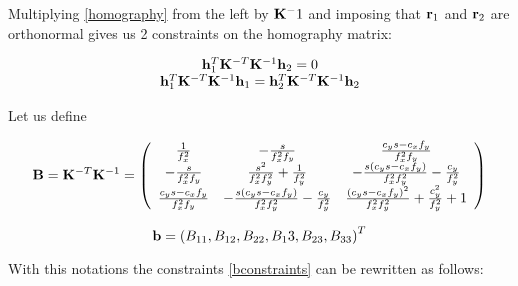 \documentclass[a4paper,10pt]{article}
\begin{document}
Multiplying \eqref{homography} from the left by ${\bf K}^-1$ and imposing that ${\bf r}_1$ and ${\bf r}_2$ are orthonormal gives us 2 constraints on the homography matrix:

{
\begin{equation}
\begin{array}{c}
 {\bf h}_1^T {\bf K}^{-T} {\bf K}^{-1}{\bf h}_2 = 0 \\
 {\bf h}_1^T {\bf K}^{-T} {\bf K}^{-1}{\bf h}_1 = {\bf h}_2^T {\bf K}^{-T} {\bf K}^{-1}{\bf h}_2
\end{array} \label{bconstraints}
\end{equation}
}

Let us define 

{
\begin{equation}
 {\bf B} = {\bf K}^{-T} {\bf K}^{-1} = \left(
 \begin{array}{ccc}
 \frac{1}{f_x^2} & -\frac{s}{f_x^2 f_y} & \frac{c_y s - c_x f_y}{f_x^2f_y}\\
 -\frac{s}{f_x^2 f_y} & \frac{s^2}{f_x^2f_y^2} + \frac{1}{f_y^2} & -\frac{s(c_y s - c_x f_y)}{f_x^2 f_y^2} - \frac{c_y}{f_y^2} \\
 \frac{c_y s - c_x f_y}{f_x^2 f_y} & - \frac{s(c_y s - c_x f_y)}{f_x^2 f_y^2} - \frac{c_y}{f_y^2} & \frac{(c_y s - c_x f_y)^2}{f_x^2 f_y^2} + \frac{c_y^2}{f_y^2} + 1
 \end{array}
\right)
\end{equation}
}

\begin{equation}
 {\bf b} = \left(B_{11},B_{12}, B_{22}, B_13, B_{23}, B_{33}\right)^T
\end{equation}

With this notations the constraints \eqref{bconstraints} can be rewritten as follows:

\end{document}
